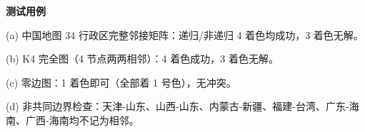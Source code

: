 {
\fontsize{7.5pt}{10pt}\selectfont
\setlength{\parindent}{0pt}
\noindent\textbf{测试用例}\par
\noindent (a) 中国地图 34 行政区完整邻接矩阵：递归/非递归 4 着色均成功，3 着色无解。\par
\noindent (b) K4 完全图（4 节点两两相邻）：4 着色成功，3 着色无解。\par
\noindent (c) 零边图：1 着色即可（全部着 1 号色），无冲突。\par
\noindent (d) 非共同边界检查：天津-山东、山西-山东、内蒙古-新疆、福建-台湾、广东-海南、广西-海南均不记为相邻。\par
}

